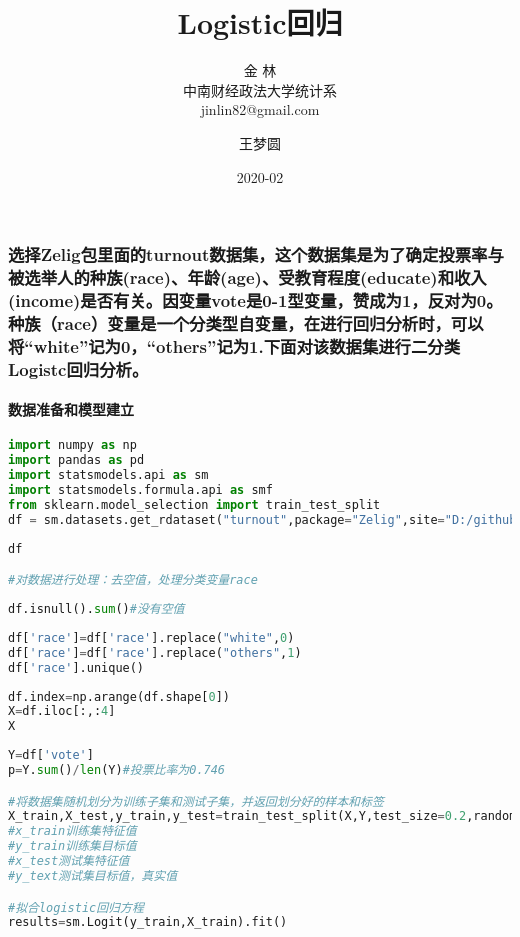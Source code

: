 \documentclass[UTF8,a4paper,12pt]{ctexart}  %
\author{\CJKfamily{kai} 金 \enspace 林 \\ \CJKfamily{kai} 中南财经政法大学统计系 \\ jinlin82@gmail.com}
\title{\LARGE\textbf{Logistic回归}}
\author{王梦圆}
\date{2020-02}
\begin{document}
\maketitle

\hypertarget{zeligturnoutraceageeducateincomevote0-110racewhite0others1.logistc}{%
\subsubsection{选择Zelig包里面的turnout数据集，这个数据集是为了确定投票率与被选举人的种族(race)、年龄(age)、受教育程度(educate)和收入(income)是否有关。因变量vote是0-1型变量，赞成为1，反对为0。种族（race）变量是一个分类型自变量，在进行回归分析时，可以将``white''记为0，``others''记为1.下面对该数据集进行二分类Logistc回归分析。}\label{zeligturnoutraceageeducateincomevote0-110racewhite0others1.logistc}}

\paragraph{数据准备和模型建立}

\begin{lstlisting}[language=Python]
import numpy as np
import pandas as pd
import statsmodels.api as sm 
import statsmodels.formula.api as smf
from sklearn.model_selection import train_test_split
df = sm.datasets.get_rdataset("turnout",package="Zelig",site="D:/github_repo/Rdatasets").data
\end{lstlisting}

\begin{lstlisting}[language=Python]
df

#对数据进行处理：去空值，处理分类变量race
\end{lstlisting}

\begin{lstlisting}[language=Python]
df.isnull().sum()#没有空值
\end{lstlisting}

\begin{lstlisting}[language=Python]
df['race']=df['race'].replace("white",0)
df['race']=df['race'].replace("others",1)
df['race'].unique()
\end{lstlisting}

\begin{lstlisting}[language=Python]
df.index=np.arange(df.shape[0])
X=df.iloc[:,:4]
X
\end{lstlisting}

\begin{lstlisting}[language=Python]
Y=df['vote']
p=Y.sum()/len(Y)#投票比率为0.746

#将数据集随机划分为训练子集和测试子集，并返回划分好的样本和标签
X_train,X_test,y_train,y_test=train_test_split(X,Y,test_size=0.2,random_state=0)
#x_train训练集特征值
#y_train训练集目标值
#x_test测试集特征值
#y_text测试集目标值，真实值

#拟合logistic回归方程
results=sm.Logit(y_train,X_train).fit()
\end{lstlisting}
\end{document}
